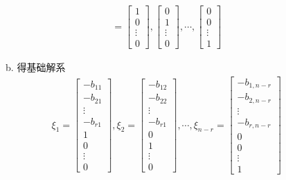 \documentclass[12pt]{book}
\begin{document}
\begin{enumerate}[1.]
\begin{enumerate}[(1)]
\begin{enumerate}[a.]
\begin{gather*}
                                  = \begin{bmatrix}
                                      1 \\0\\\vdots\\0
                                  \end{bmatrix},\begin{bmatrix}
                                      0 \\1\\\vdots\\0
                                  \end{bmatrix},\cdots,\begin{bmatrix}
                                      0 \\0\\\vdots\\1
                                  \end{bmatrix}
                              \end{gather*}
                        \item 得基础解系
                              \begin{gather*}
                                  \xi_1 = \begin{bmatrix}
                                      -b_{11} \\-b_{21}\\\vdots\\-b_{r1}\\1\\0\\\vdots\\0
                                  \end{bmatrix},
                                  \xi_2 = \begin{bmatrix}
                                      -b_{12} \\-b_{22}\\\vdots\\-b_{r1}\\0\\1\\\vdots\\0
                                  \end{bmatrix},
                                  \cdots,
                                  \xi_{n-r} = \begin{bmatrix}
                                      -b_{1,n-r} \\-b_{2,n-r}\\\vdots\\-b_{r,n-r}\\0\\0\\\vdots\\1

\end{bmatrix}
\end{gather*}
\end{enumerate}
\end{enumerate}
\end{enumerate}
\end{document}
